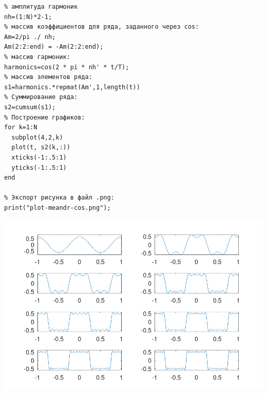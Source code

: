\begin{enumerate}
\begin{verbatim}
% амплитуда гармоник
nh=(1:N)*2-1;
% массив коэффициентов для ряда, заданного через cos:
Am=2/pi ./ nh;
Am(2:2:end) = -Am(2:2:end);
% массив гармоник:
harmonics=cos(2 * pi * nh' * t/T);
% массив элементов ряда:
s1=harmonics.*repmat(Am',1,length(t))
% Суммирование ряда:
s2=cumsum(s1);
% Построение графиков:
for k=1:N
  subplot(4,2,k)
  plot(t, s2(k,:))
  xticks(-1:.5:1)
  yticks(-1:.5:1)
end

% Экспорт рисунка в файл .png:
print("plot-meandr-cos.png");
        \end{verbatim}

        \begin{center}
            \centering
            \includegraphics[width=\textwidth]{../octave/plot-meandr-cos.png}
            \label{img:meandr-cos}
        \end{center}
\end{enumerate}

